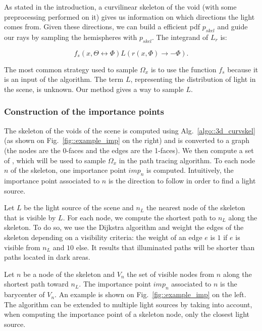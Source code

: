 As stated in the introduction, a curvilinear skeleton of the void (with some preprocessing performed on it) gives us information on which directions the light comes from. Given these directions, we can build a efficient pdf $p_{skel}$ and guide our rays by sampling the hemispheres with $p_{skel}$. The integrand of $L_r$ is:

\begin{equation*}
f_s(x, \Theta \leftrightarrow \Phi) L(r(x, \Phi) \rightarrow -\Phi).
\end{equation*}

The most common strategy used to sample $\Omega_x$ is to use the function $f_s$ because it is an input of the algorithm.
The term $L$, representing the distribution of light in the scene, is unknown. Our method gives a way to sample $L$.


\subsubsection{Construction of the importance points}

The skeleton of the voids of the scene is computed using Alg.~\ref{algo::3d_curvskel} (as shown on Fig.~\ref{fig::example_imp} on the right) and is converted to a graph (the nodes are the 0-faces and the edges are the 1-faces). We then compute a set of , which will be used to sample $\Omega_x$ in the path tracing algorithm. To each node $n$ of the skeleton, one importance point $imp_n$ is computed. Intuitively, the importance point associated to $n$ is the direction to follow in order to find a light source.

Let $L$ be the light source of the scene and $n_L$ the nearest node of the skeleton that is visible by $L$. For each node, we compute the shortest path to $n_L$ along the skeleton. To do so, we use the Dijkstra algorithm and weight the edges of the skeleton depending on a visibility criteria: the weight of an edge $e$ is $1$ if $e$ is visible from $n_L$ and $10$ else. It results that illuminated paths will be shorter than paths located in dark areas.

Let $n$ be a node of the skeleton and $V_n$ the set of visible nodes from $n$ along the shortest path toward $n_L$. The importance point $imp_n$ associated to $n$ is the barycenter of $V_n$. An example is shown on Fig.~\ref{fig::example_imp} on the left.
The algorithm can be extended to multiple light sources by taking into account, when computing the importance point of a skeleton node, only the closest light source.





